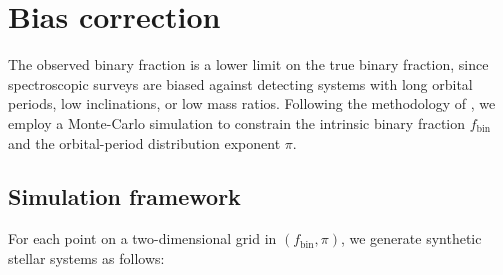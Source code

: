 \section{Bias correction}
\label{sec:bias}

The observed binary fraction is a lower limit on the true binary fraction,
since spectroscopic surveys are biased against detecting systems with long
orbital periods, low inclinations, or low mass ratios. Following the
methodology of \citet{Dsilva2023}, we employ a Monte-Carlo simulation to
constrain the intrinsic binary fraction $f_\mathrm{bin}$ and the
orbital-period distribution exponent $\pi$.

\subsection{Simulation framework}
\label{sec:sim_framework}

For each point on a two-dimensional grid in $(f_\mathrm{bin}, \pi)$, we
generate \Nsim synthetic stellar systems as follows:

